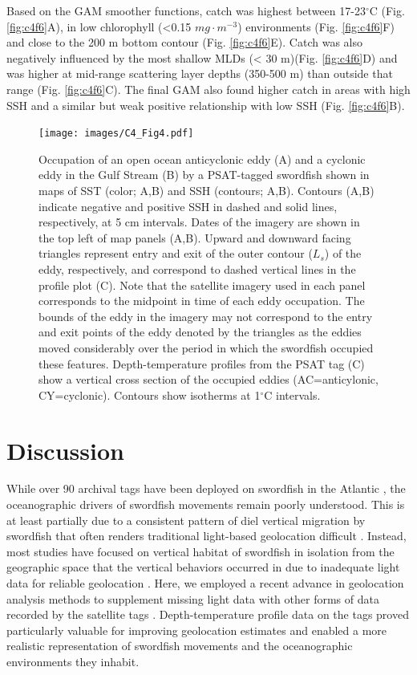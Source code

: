 Based on the GAM smoother functions, catch was highest between 17-23$^{\circ}$C (Fig. \ref{fig:c4f6}A), in low chlorophyll (<0.15 \(mg \cdot m^{-3}\)) environments (Fig. \ref{fig:c4f6}F) and close to the 200 m bottom contour (Fig. \ref{fig:c4f6}E). Catch was also negatively influenced by the most shallow MLDs (< 30 m)(Fig. \ref{fig:c4f6}D) and was higher at mid-range scattering layer depths (350-500 m) than outside that range (Fig. \ref{fig:c4f6}C). The final GAM also found higher catch in areas with high SSH and a similar but weak positive relationship with low SSH (Fig. \ref{fig:c4f6}B).

\begin{figure}[htbp]
\centering
\texttt{[image: images/C4\_Fig4.pdf]}
\caption[Example use of eddies by an archival-tagged swordfish]{Occupation of an open ocean anticyclonic eddy (A) and a cyclonic eddy in the Gulf Stream (B) by a PSAT-tagged swordfish shown in maps of SST (color; A,B) and SSH (contours; A,B). Contours (A,B) indicate negative and positive SSH in dashed and solid lines, respectively, at 5 cm intervals. Dates of the imagery are shown in the top left of map panels (A,B). Upward and downward facing triangles represent entry and exit of the outer contour ($L_s$) of the eddy, respectively, and correspond to dashed vertical lines in the profile plot (C). Note that the satellite imagery used in each panel corresponds to the midpoint in time of each eddy occupation. The bounds of the eddy in the imagery may not correspond to the entry and exit points of the eddy denoted by the triangles as the eddies moved considerably over the period in which the swordfish occupied these features. Depth-temperature profiles from the PSAT tag (C) show a vertical cross section of the occupied eddies (AC=anticylonic, CY=cyclonic). Contours show isotherms at 1$^{\circ}$C intervals.}
\label{fig:c4f4}
\end{figure}

\section{Discussion}

While over 90 archival tags have been deployed on swordfish in the Atlantic \citep{Braun2015}, the oceanographic drivers of swordfish movements remain poorly understood. This is at least partially due to a consistent pattern of diel vertical migration by swordfish that often renders traditional light-based geolocation difficult \citep{Dewar2011, Lerner2013}. Instead, most studies have focused on vertical habitat of swordfish in isolation from the geographic space that the vertical behaviors occurred in due to inadequate light data for reliable geolocation \citep{Abecassis2012, Dewar2011, Evans2014, Loefer2007, Lerner2013}. Here, we employed a recent advance in geolocation analysis methods to supplement missing light data with other forms of data recorded by the satellite tags \citep{Braun2018a}. Depth-temperature profile data on the tags proved particularly valuable for improving geolocation estimates and enabled a more realistic representation of swordfish movements and the oceanographic environments they inhabit.

